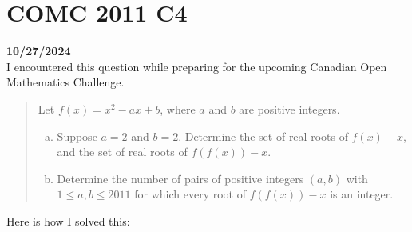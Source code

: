 \documentclass[12pt, oneside]{article}
\begin{document}
\section*{COMC 2011 C4}
\textbf{10/27/2024}\\
I encountered this question while preparing for the upcoming Canadian Open Mathematics Challenge.
\begin{quote}
Let $f(x) = x^2 - ax + b$, where $a$ and $b$ are positive integers.
\begin{enumerate} [a)]
\item Suppose $a=2$ and $b=2$. Determine the set of real roots of $f(x) - x$, and the set of real roots of $f(f(x)) - x$. 
\item Determine the number of pairs of positive integers $(a, b)$ with $1 \leq a,b \leq 2011$ for which every root of $f(f(x)) -x$ is an integer.
\end{enumerate}
\end{quote}
Here is how I solved this:
\end{document}
